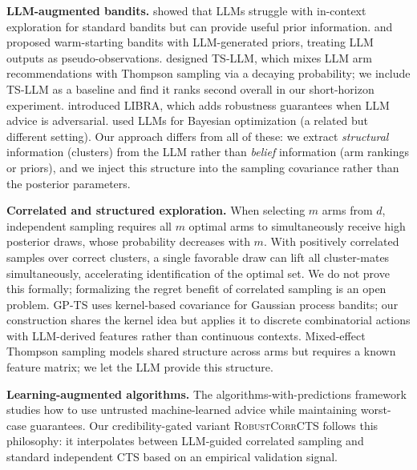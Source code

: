 \documentclass{article}
\theoremstyle{plain}
\theoremstyle{definition}
\theoremstyle{remark}
\newcommand{\RobustCorr}{\textsc{RobustCorrCTS}}
\begin{document}
\textbf{LLM-augmented bandits.}
\citet{krishnamurthy2024canllms} showed that LLMs struggle with in-context exploration for standard bandits but can provide useful prior information.
\citet{alamdari2024jumpstarting} and \citet{bayley2025jumpstart} proposed warm-starting bandits with LLM-generated priors, treating LLM outputs as pseudo-observations.
\citet{sun2025tsllm} designed TS-LLM, which mixes LLM arm recommendations with Thompson sampling via a decaying probability; we include TS-LLM as a baseline and find it ranks second overall in our short-horizon experiment.
\citet{cao2026libra} introduced LIBRA, which adds robustness guarantees when LLM advice is adversarial.
\citet{liu2024llambo} used LLMs for Bayesian optimization (a related but different setting).
Our approach differs from all of these: we extract \emph{structural} information (clusters) from the LLM rather than \emph{belief} information (arm rankings or priors), and we inject this structure into the sampling covariance rather than the posterior parameters.

\textbf{Correlated and structured exploration.}
When selecting $m$ arms from $d$, independent sampling requires all $m$ optimal arms to simultaneously receive high posterior draws, whose probability decreases with $m$.
With positively correlated samples over correct clusters, a single favorable draw can lift all cluster-mates simultaneously, accelerating identification of the optimal set.
We do not prove this formally; formalizing the regret benefit of correlated sampling is an open problem.
GP-TS \citep{srinivas2010gpucb} uses kernel-based covariance for Gaussian process bandits; our construction shares the kernel idea but applies it to discrete combinatorial actions with LLM-derived features rather than continuous contexts.
Mixed-effect Thompson sampling \citep{kveton2023mixed} models shared structure across arms but requires a known feature matrix; we let the LLM provide this structure.

\textbf{Learning-augmented algorithms.}
The algorithms-with-predictions framework \citep{lykouris2018competitive} studies how to use untrusted machine-learned advice while maintaining worst-case guarantees.
Our credibility-gated variant \RobustCorr{} follows this philosophy: it interpolates between LLM-guided correlated sampling and standard independent CTS based on an empirical validation signal.

\end{document}
